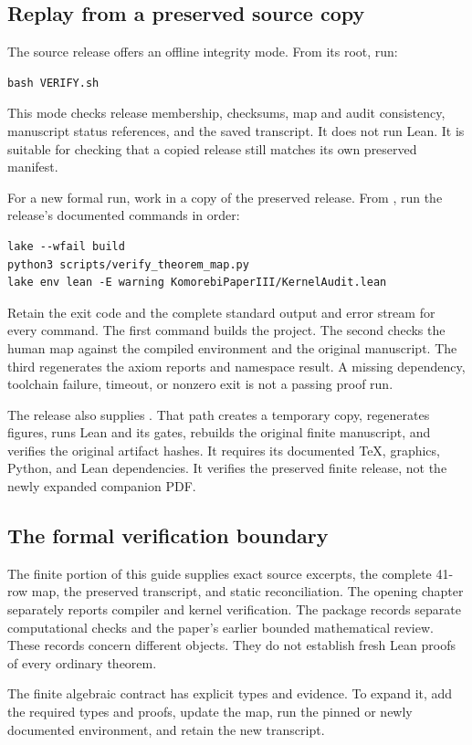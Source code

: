 \subsection{Replay from a preserved source copy}
The source release offers an offline integrity mode. From its root, run:
\begin{Verbatim}[fontsize=\small,frame=leftline,breaklines=true]
bash VERIFY.sh
\end{Verbatim}
This mode checks release membership, checksums, map and audit consistency, manuscript status references, and the saved transcript. It does not run Lean. It is suitable for checking that a copied release still matches its own preserved manifest.

For a new formal run, work in a copy of the preserved release. From , run the release's documented commands in order:
\begin{Verbatim}[fontsize=\small,frame=leftline,breaklines=true]
lake --wfail build
python3 scripts/verify_theorem_map.py
lake env lean -E warning KomorebiPaperIII/KernelAudit.lean
\end{Verbatim}
Retain the exit code and the complete standard output and error stream for every command. The first command builds the project. The second checks the human map against the compiled environment and the original manuscript. The third regenerates the axiom reports and namespace result. A missing dependency, toolchain failure, timeout, or nonzero exit is not a passing proof run.

The release also supplies . That path creates a temporary copy, regenerates figures, runs Lean and its gates, rebuilds the original finite manuscript, and verifies the original artifact hashes. It requires its documented TeX, graphics, Python, and Lean dependencies. It verifies the preserved finite release, not the newly expanded companion PDF.

\subsection{The formal verification boundary}
The finite portion of this guide supplies exact source excerpts, the complete 41-row map, the preserved transcript, and static reconciliation. The opening chapter separately reports compiler and kernel verification. The package records separate computational checks and the paper's earlier bounded mathematical review. These records concern different objects. They do not establish fresh Lean proofs of every ordinary theorem.

The finite algebraic contract has explicit types and evidence. To expand it, add the required types and proofs, update the map, run the pinned or newly documented environment, and retain the new transcript.
